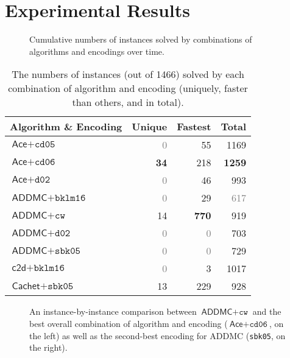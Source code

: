 \section{Experimental Results} \label{sec:2experiments}

\begin{figure*}[t]
  \centering
  \caption{Cumulative numbers of instances solved by combinations of algorithms
    and encodings over time.}
  \label{fig:cumulative}
\end{figure*}

\begin{table}
  \centering
  \caption{The numbers of instances (out of 1466) solved by
    each combination of algorithm and encoding (uniquely, faster than others, and in total).}%
  \begin{tabular}{lrrr}
    \toprule
    Algorithm \& Encoding & Unique & Fastest & Total \\
    \midrule
    $\textsf{Ace} + \texttt{cd05}$ & \textcolor{gray}{0} & 55 & 1169 \\
    $\textsf{Ace} + \texttt{cd06}$ & \textbf{34} & 218 & \textbf{1259} \\
    $\textsf{Ace} + \texttt{d02}$ & \textcolor{gray}{0} & 46 & 993 \\
    $\textsf{ADDMC} + \texttt{bklm16}$ & \textcolor{gray}{0} & 29 & \textcolor{gray}{617} \\
    $\textsf{ADDMC} + \texttt{cw}$ & 14 & \textbf{770} & 919 \\
    $\textsf{ADDMC} + \texttt{d02}$ & \textcolor{gray}{0} & \textcolor{gray}{0} & 703 \\
    $\textsf{ADDMC} + \texttt{sbk05}$ & \textcolor{gray}{0} & \textcolor{gray}{0} & 729 \\
    $\textsf{c2d} + \texttt{bklm16}$ & \textcolor{gray}{0} & 3 & 1017 \\
    $\textsf{Cachet} + \texttt{sbk05}$ & 13 & 229 & 928 \\
    \bottomrule
  \end{tabular}
  \label{tbl:tallies}
\end{table}

\begin{figure*}[t]
  \centering
  \caption{An instance-by-instance comparison between $\textsf{ADDMC} +
    \texttt{cw}$ and the best overall combination of algorithm and encoding
    ($\textsf{Ace} + \texttt{cd06}$, on the left) as well as the second-best
    encoding for \textsf{ADDMC} (\texttt{sbk05}, on the right).}
  \label{fig:scatter}
\end{figure*}

